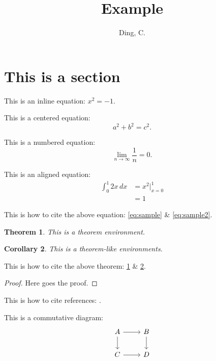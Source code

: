 \documentclass{article}
\title{Example}
\author{Ding, C.}
\date{}
\newtheorem{theorem}{Theorem}
\newtheorem{corollary}[theorem]{Corollary}
\begin{document}
\section{This is a section}

This is an inline equation: $x^2=-1$.

This is a centered equation: $$a^2+b^2=c^2.$$

This is a numbered equation: 
\begin{equation}
\lim_{n\to\infty}\frac{1}{n}=0.
\label{eq:sample}
\end{equation}

This is an aligned equation:
\begin{align}
	\int_{0}^{1}2x\,dx 
	&=x^2\Big|_{x=0}^1\label{eq:sample2}\\
	&=1
\end{align}

	
This is how to cite the above equation: \eqref{eq:sample} \& \eqref{eq:sample2}.

\begin{theorem} \label{thm:sample}
	This is a theorem environment.
\end{theorem}

\begin{corollary}\label{corollary}
	This is a theorem-like environments.
\end{corollary}

This is how to cite the above theorem: \ref{thm:sample} \& \ref{corollary}.

\begin{proof}
	Here goes the proof.
\end{proof}

This is how to cite references: \cite{mac2013categories}.

This is a commutative diagram:
\begin{equation*}
  \begin{tikzcd}
    A \ar[r] \ar[d] & B \ar[d] \\ C \ar[r] & D
  \end{tikzcd}
\end{equation*}





\end{document}
